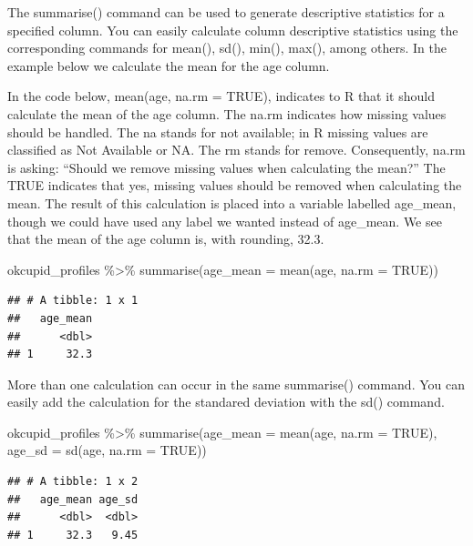 \documentclass[
]{krantz}
\makeatletter
\newenvironment{Shaded}{\begin{snugshade}}{\end{snugshade}}
\newcommand{\AttributeTok}[1]{\textcolor[rgb]{0.61,0.61,0.61}{#1}}
\newcommand{\ConstantTok}[1]{\textcolor[rgb]{0,0,0}{#1}}
\newcommand{\FunctionTok}[1]{\textcolor[rgb]{0,0,0}{#1}}
\newcommand{\NormalTok}[1]{#1}
\newcommand{\SpecialCharTok}[1]{\textcolor[rgb]{0,0,0}{#1}}
\newenvironment{kframe}{%
\medskip{}
\setlength{\fboxsep}{.8em}
 \def\at@end@of@kframe{}%
 \ifinner\ifhmode%
  \def\at@end@of@kframe{\end{minipage}}%
  \begin{minipage}{\columnwidth}%
 \fi\fi%
 \def\FrameCommand##1{\hskip\@totalleftmargin \hskip-\fboxsep
 \colorbox{shadecolor}{##1}\hskip-\fboxsep
     \hskip-\linewidth \hskip-\@totalleftmargin \hskip\columnwidth}%
 \MakeFramed {\advance\hsize-\width
   \@totalleftmargin\z@ \linewidth\hsize
   \@setminipage}}%
 {\par\unskip\endMakeFramed%
 \at@end@of@kframe}
\renewenvironment{Shaded}{\begin{kframe}}{\end{kframe}}
\makeatother
\begin{document}
The summarise() command can be used to generate descriptive statistics for a specified column. You can easily calculate column descriptive statistics using the corresponding commands for mean(), sd(), min(), max(), among others. In the example below we calculate the mean for the age column.

In the code below, mean(age, na.rm = TRUE), indicates to R that it should calculate the mean of the age column. The na.rm indicates how missing values should be handled. The na stands for not available; in R missing values are classified as Not Available or NA. The rm stands for remove. Consequently, na.rm is asking: ``Should we remove missing values when calculating the mean?'' The TRUE indicates that yes, missing values should be removed when calculating the mean. The result of this calculation is placed into a variable labelled age\_mean, though we could have used any label we wanted instead of age\_mean. We see that the mean of the age column is, with rounding, 32.3.

\begin{Shaded}
\begin{Highlighting}[]
\NormalTok{okcupid\_profiles }\SpecialCharTok{\%\textgreater{}\%} 
  \FunctionTok{summarise}\NormalTok{(}\AttributeTok{age\_mean =} \FunctionTok{mean}\NormalTok{(age, }\AttributeTok{na.rm =} \ConstantTok{TRUE}\NormalTok{))}
\end{Highlighting}
\end{Shaded}

\begin{verbatim}
## # A tibble: 1 x 1
##   age_mean
##      <dbl>
## 1     32.3
\end{verbatim}

More than one calculation can occur in the same summarise() command. You can easily add the calculation for the standared deviation with the sd() command.

\begin{Shaded}
\begin{Highlighting}[]
\NormalTok{okcupid\_profiles }\SpecialCharTok{\%\textgreater{}\%} 
  \FunctionTok{summarise}\NormalTok{(}\AttributeTok{age\_mean =} \FunctionTok{mean}\NormalTok{(age, }\AttributeTok{na.rm =} \ConstantTok{TRUE}\NormalTok{),}
            \AttributeTok{age\_sd =} \FunctionTok{sd}\NormalTok{(age, }\AttributeTok{na.rm =} \ConstantTok{TRUE}\NormalTok{))}
\end{Highlighting}
\end{Shaded}

\begin{verbatim}
## # A tibble: 1 x 2
##   age_mean age_sd
##      <dbl>  <dbl>
## 1     32.3   9.45
\end{verbatim}
\end{document}
